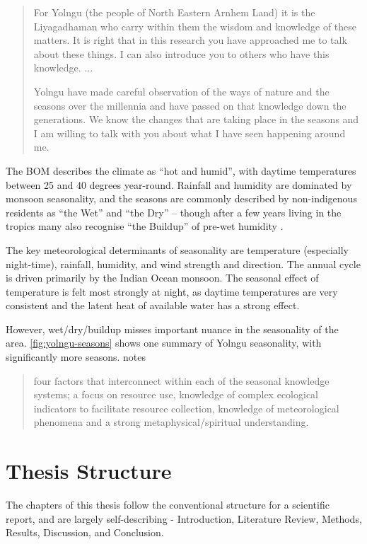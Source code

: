 \blockquote{
    For Yolngu (the people of North Eastern Arnhem Land) it is the Liyagadhaman
    who carry within them the wisdom and knowledge of these matters.
    It is right that in this research you have approached me to talk about these
    things. I can also introduce you to others who have this knowledge.  ...

    Yolngu have made careful observation of the ways of nature and the seasons
    over the millennia and have passed on that knowledge down the generations.
    We know the changes that are taking place in the seasons and I am willing
    to talk with you about what I have seen happening around me.
}




The BOM describes the
climate as ``hot and humid'', with daytime temperatures between 25 and 40
degrees year-round.  Rainfall and humidity are dominated by monsoon
seasonality, and the seasons are commonly described by non-indigenous residents
as “the Wet” and “the Dry” – though after a few years living in the tropics
many also recognise “the Buildup” of pre-wet humidity \citep{willmett2009}.

The key meteorological determinants of seasonality are temperature (especially
night-time), rainfall, humidity, and wind strength and direction.  The annual
cycle is driven primarily by the Indian Ocean monsoon.  The seasonal effect of
temperature is felt most strongly at night, as daytime temperatures are very
consistent and the latent heat of available water has a strong effect.

However, wet/dry/buildup misses important nuance in the seasonality of the
area.  \autoref{fig:yolngu-seasons} shows one summary of Yolngu seasonality,
with significantly more seasons.  \citet{woodward2012b} notes
\blockquote{
    four factors that interconnect within each of the seasonal
    knowledge systems; a focus on resource use, knowledge of complex
    ecological indicators to facilitate resource collection,
    knowledge of meteorological phenomena and a strong
    metaphysical/spiritual understanding.
}



\section{Thesis Structure}

The chapters of this thesis follow the conventional structure for a scientific
report, and are largely self-describing - Introduction, Literature Review,
Methods, Results, Discussion, and Conclusion.

